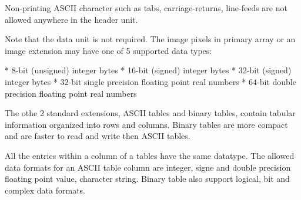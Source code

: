 Non-printing ASCII character such as tabs,
carriage-returns, line-feeds are not allowed anywhere in
the header unit.

Note that the data unit is not required. The image pixels
in primary array or an image extension may have one of
5 supported data types:

\begitems
* 8-bit (unsigned) integer bytes
* 16-bit (signed) integer bytes
* 32-bit (signed) integer bytes
* 32-bit single precision floating point real numbers
* 64-bit double precision floating point real numbers
\enditems

The othe 2 standard extensions, ASCII tables and binary
tables, contain tabular information organized into rows
and columns. Binary tables are more compact and are faster
to read and write then ASCII tables.

All the entries within a column of a tables have the same
datatype. The allowed data formats for an ASCII table
column are integer, signe and double precision floating
point value, character string. Binary table also support
logical, bit and complex data formats.
